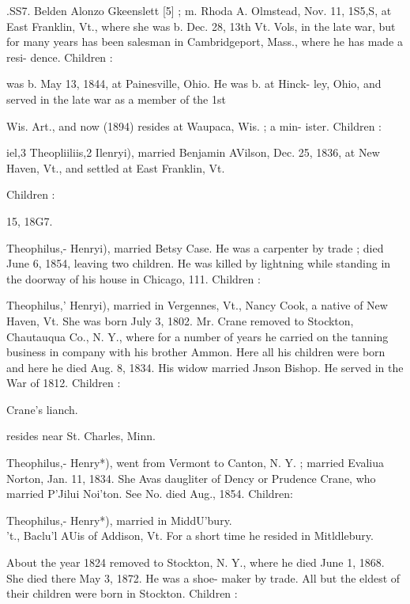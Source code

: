 \documentclass[oneside]{book}
\begin{document}
.SS7. Belden Alonzo Gkeenslett [5] ; m. Rhoda A. Olmstead, Nov. 
11, 1S5,S, at East Franklin, Vt., where she was b. Dec. 28, 
13th Vt. Vols, in the late war, but for many years has been 
salesman in Cambridgeport, Mass., where he has made a resi- 
dence. Children : 





was b. May 13, 1844, at Painesville, Ohio. He was b. at Hinck- 
ley, Ohio, and served in the late war as a member of the 1st 




Wis. Art., and now (1894) resides at Waupaca, Wis. ; a min- 
ister. Children : 





iel,3 Theopliiliis,2 Ilenryi), married Benjamin AVilson, Dec. 25, 
1836, at New Haven, Vt., and settled at East Franklin, Vt. 

Children : 



15, 18G7. 

Theophilus,- Henryi), married Betsy Case. He was a carpenter 
by trade ; died June 6, 1854, leaving two children. He was 
killed by lightning while standing in the doorway of his house in 
Chicago, 111. Children : 


Theophilus,' Henryi), married in Vergennes, Vt., Nancy Cook, 
a native of New Haven, Vt. She was born July 3, 1802. Mr. 
Crane removed to Stockton, Chautauqua Co., N. Y., where for a 
number of years he carried on the tanning business in company 
with his brother Ammon. Here all his children were born and 
here he died Aug. 8, 1834. His widow married Jnson Bishop. 
He served in the War of 1812. Children : 



Crane's lianch. 

resides near St. Charles, Minn. 

Theophilus,- Henry*), went from Vermont to Canton, N. Y. ; 
married Evaliua Norton, Jan. 11, 1834. She Avas daugliter of 
Dency or Prudence Crane, who married P'Jilui Noi'ton. See No. 
died Aug., 1854. Children: 





Theophilus,- Henry*), married in MiddU'bury. \\'t., Baclu'l AUis 
of Addison, Vt. For a short time he resided in Mitldlebury. 




About the year 1824 removed to Stockton, N. Y., where he died 
June 1, 1868. She died there May 3, 1872. He was a shoe- 
maker by trade. All but the eldest of their children were born 
in Stockton. Children : 
\end{document}
